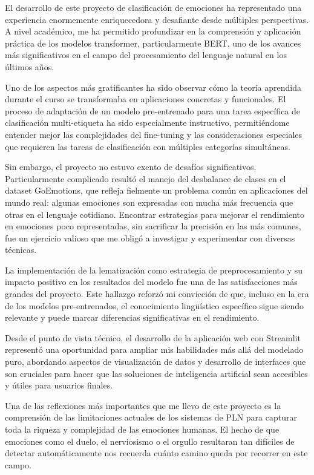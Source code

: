 \documentclass[12pt,a4paper]{report}
\begin{document}
El desarrollo de este proyecto de clasificación de emociones ha representado una experiencia enormemente enriquecedora y desafiante desde múltiples perspectivas. A nivel académico, me ha permitido profundizar en la comprensión y aplicación práctica de los modelos transformer, particularmente BERT, uno de los avances más significativos en el campo del procesamiento del lenguaje natural en los últimos años.

Uno de los aspectos más gratificantes ha sido observar cómo la teoría aprendida durante el curso se transformaba en aplicaciones concretas y funcionales. El proceso de adaptación de un modelo pre-entrenado para una tarea específica de clasificación multi-etiqueta ha sido especialmente instructivo, permitiéndome entender mejor las complejidades del fine-tuning y las consideraciones especiales que requieren las tareas de clasificación con múltiples categorías simultáneas.

Sin embargo, el proyecto no estuvo exento de desafíos significativos. Particularmente complicado resultó el manejo del desbalance de clases en el dataset GoEmotions, que refleja fielmente un problema común en aplicaciones del mundo real: algunas emociones son expresadas con mucha más frecuencia que otras en el lenguaje cotidiano. Encontrar estrategias para mejorar el rendimiento en emociones poco representadas, sin sacrificar la precisión en las más comunes, fue un ejercicio valioso que me obligó a investigar y experimentar con diversas técnicas.

La implementación de la lematización como estrategia de preprocesamiento y su impacto positivo en los resultados del modelo fue una de las satisfacciones más grandes del proyecto. Este hallazgo reforzó mi convicción de que, incluso en la era de los modelos pre-entrenados, el conocimiento lingüístico específico sigue siendo relevante y puede marcar diferencias significativas en el rendimiento.

Desde el punto de vista técnico, el desarrollo de la aplicación web con Streamlit representó una oportunidad para ampliar mis habilidades más allá del modelado puro, abordando aspectos de visualización de datos y desarrollo de interfaces que son cruciales para hacer que las soluciones de inteligencia artificial sean accesibles y útiles para usuarios finales.

Una de las reflexiones más importantes que me llevo de este proyecto es la comprensión de las limitaciones actuales de los sistemas de PLN para capturar toda la riqueza y complejidad de las emociones humanas. El hecho de que emociones como el duelo, el nerviosismo o el orgullo resultaran tan difíciles de detectar automáticamente nos recuerda cuánto camino queda por recorrer en este campo.
\end{document}
